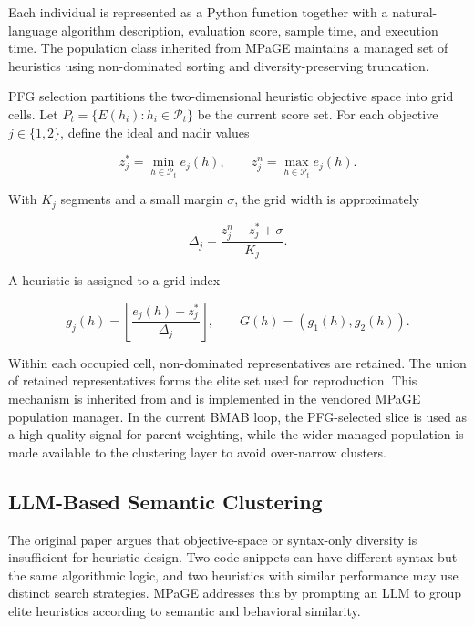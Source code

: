 \documentclass[../main.tex]{subfiles}
\begin{document}
Each individual is represented as a Python function together with a natural-language algorithm description, evaluation score, sample time, and execution time. The population class inherited from MPaGE maintains a managed set of heuristics using non-dominated sorting and diversity-preserving truncation.

PFG selection partitions the two-dimensional heuristic objective space into grid cells. Let $P_t = \{E(h_i): h_i \in \mathcal{P}_t\}$ be the current score set. For each objective $j \in \{1,2\}$, define the ideal and nadir values

\begin{equation}
  z_j^{\ast} = \min_{h \in \mathcal{P}_t} e_j(h), \qquad
  z_j^{n} = \max_{h \in \mathcal{P}_t} e_j(h).
\end{equation}

With $K_j$ segments and a small margin $\sigma$, the grid width is approximately

\begin{equation}
  \Delta_j = \frac{z_j^{n} - z_j^{\ast} + \sigma}{K_j}.
\end{equation}

A heuristic is assigned to a grid index

\begin{equation}
  g_j(h)=\left\lfloor \frac{e_j(h)-z_j^{\ast}}{\Delta_j}\right\rfloor,
  \qquad
  G(h)=(g_1(h),g_2(h)).
\end{equation}

Within each occupied cell, non-dominated representatives are retained. The union of retained representatives forms the elite set used for reproduction. This mechanism is inherited from \mpage{} and is implemented in the vendored MPaGE population manager. In the current BMAB loop, the PFG-selected slice is used as a high-quality signal for parent weighting, while the wider managed population is made available to the clustering layer to avoid over-narrow clusters.

\subsection{LLM-Based Semantic Clustering}

The original \mpage{} paper argues that objective-space or syntax-only diversity is insufficient for heuristic design. Two code snippets can have different syntax but the same algorithmic logic, and two heuristics with similar performance may use distinct search strategies. MPaGE addresses this by prompting an LLM to group elite heuristics according to semantic and behavioral similarity.
\end{document}
